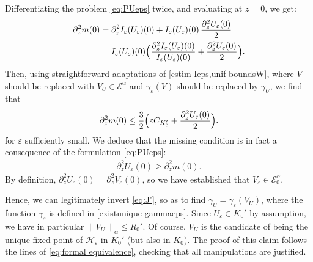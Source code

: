 \documentclass[JEP,XML,SOM,Unicode]{cedram}
\let\mathcal\mathscr
\theoremstyle{plain}
\theoremstyle{definition}
\renewcommand{\H}{\mathcal{H}_\eps}
\let\eps\varepsilon
\newcommand{\nalph}[1]{\left\lVert#1\right\rVert_\alpha}
\newcommand{\Ea}{\mathcal{E}^\alpha}
\newcommand{\Eaz}{\mathcal{E}^\alpha_0}
\begin{document}
Differentiating the problem \eqref{eq:PUeps} twice, and evaluating at $z=0$, we get:
\begin{align*}
\partial_z^2 m(0) & = \partial_z^2 I_\eps(U_\eps)(0) + I_\eps(U_\eps)(0)\, \dfrac{\partial_z^2 U_\eps(0)}{2} \\
& = I_\eps(U_\eps)(0) \Bigl(\dfrac{\partial_z^2 I_\eps(U_\eps)(0)}{I_\eps(U_\eps)(0)} + \dfrac{\partial_z^2 U_\eps(0)}{2} \Bigr).
\end{align*}
Then, using straightforward adaptations of \cref{estim Ieps,unif boundsW}, where $V$ should be replaced with $V_U\in \Ea$ and $\gamma_\eps(V)$ should be replaced by $\gamma_U$, we find that
\begin{align*}
\partial_z^2 m(0) \leq \frac32 \Bigl(\eps C_{K_0'} + \dfrac{\partial_z^2 U_\eps(0)}{2} \Bigr).
\end{align*}
for $\eps$ sufficiently small.
We deduce that the missing condition is in fact a consequence of the formulation \eqref{eq:PUeps}:
\begin{align*}
\partial_z^2 U_\eps(0) \geq \partial_z^2 m(0).
\end{align*}
By definition, $\partial_z^2 U_\eps(0) = \partial_z^2 V_\eps(0)$, so we have established that $V_\eps \in \Eaz$.

Hence, we can legitimately invert \eqref{eq:J'}, so as to find $\gamma_U = \gamma_\eps(V_U)$, where the function $\gamma_\eps$ is defined in \cref{existunique gammaeps}. Since $U_\eps\in K_0'$ by assumption, we have in particular $\nalph{V_U}\leq R_0'$. Of course, $V_U$ is the candidate of being the unique fixed point of $\H$ in $K_0'$ (but also in $K_0$). The proof of this claim follows the lines of \cref{eq:formal equivalence}, checking that all manipulations are justified.
\end{document}
